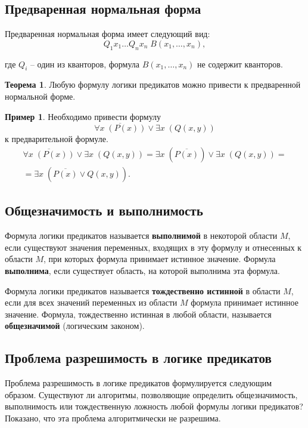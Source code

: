 \documentclass[a5paper, 11pt]{extarticle}
\theoremstyle{definition}
\newtheorem*{theorem*}{Теорема}
\newtheorem*{example*}{Пример}
\theoremstyle{definition}
\theoremstyle{definition}
\numberwithin{figure}{section}
\numberwithin{table}{section}
\begin{document}
\subsection{Предваренная нормальная форма}

Предваренная нормальная форма имеет следующий вид:
\[
    Q_1 x_1 \ldots Q_n x_n \; B(x_1, \ldots, x_n),
\]

где \(Q_i\) -- один из кванторов, формула \(B(x_1, \ldots, x_n)\) не содержит кванторов.

\begin{theorem*}
    Любую формулу логики предикатов можно привести к предваренной нормальной форме.
\end{theorem*}

\begin{example*}
    Необходимо привести формулу
    \[
        \overline{\forall x \; (P(x))} \lor \exists x \; (Q(x, y))
    \]
    к предварительной формуле.
    \begin{gather*}
        \overline{\forall x \; (P(x))} \lor \exists x \; (Q(x, y)) =
        \exists x \; (\overline{P(x)}) \lor \exists x \; (Q(x, y)) = \\=
        \exists x \; (\overline{P(x)} \lor Q(x, y)).
    \end{gather*}
\end{example*}

\subsection{Общезначимость и выполнимость}

Формула логики предикатов называется \textbf{выполнимой} в некоторой области \(M\), если существуют значения переменных, входящих в эту формулу и отнесенных к области \(M\), при которых формула принимает истинное значение. Формула \textbf{выполнима}, если существует область, на которой выполнима эта формула.

Формула логики предикатов называется \textbf{тождественно истинной} в области \(M\), если для всех значений переменных из области \(M\) формула принимает истинное значение. Формула, тождественно истинная в любой области, называется \textbf{общезначимой} (логическим законом).

\subsection{Проблема разрешимость в логике предикатов}

Проблема разрешимость в логике предикатов формулируется следующим образом. Существуют ли алгоритмы, позволяющие определить общезначимость, выполнимость или тождественную ложность любой формулы логики предикатов? Показано, что эта проблема алгоритмически не разрешима.
\end{document}
